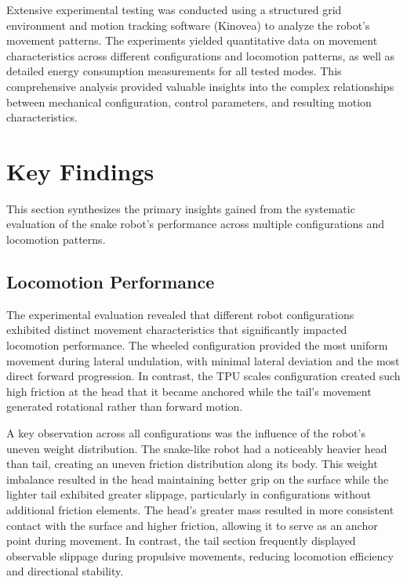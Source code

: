 \documentclass[12pt,a4paper]{report}
\begin{document}
Extensive experimental testing was conducted using a structured grid environment and motion tracking software (Kinovea) to analyze the robot's movement patterns. The experiments yielded quantitative data on movement characteristics across different configurations and locomotion patterns, as well as detailed energy consumption measurements for all tested modes. This comprehensive analysis provided valuable insights into the complex relationships between mechanical configuration, control parameters, and resulting motion characteristics.

\section{Key Findings}
\label{sec:findings}

This section synthesizes the primary insights gained from the systematic evaluation of the snake robot's performance across multiple configurations and locomotion patterns.

\subsection{Locomotion Performance}
\label{subsec:loco_findings}

The experimental evaluation revealed that different robot configurations exhibited distinct movement characteristics that significantly impacted locomotion performance. The wheeled configuration provided the most uniform movement during lateral undulation, with minimal lateral deviation and the most direct forward progression. In contrast, the TPU scales configuration created such high friction at the head that it became anchored while the tail's movement generated rotational rather than forward motion.

A key observation across all configurations was the influence of the robot's uneven weight distribution. The snake-like robot had a noticeably heavier head than tail, creating an uneven friction distribution along its body. This weight imbalance resulted in the head maintaining better grip on the surface while the lighter tail exhibited greater slippage, particularly in configurations without additional friction elements. The head's greater mass resulted in more consistent contact with the surface and higher friction, allowing it to serve as an anchor point during movement. In contrast, the tail section frequently displayed observable slippage during propulsive movements, reducing locomotion efficiency and directional stability.
\end{document}
